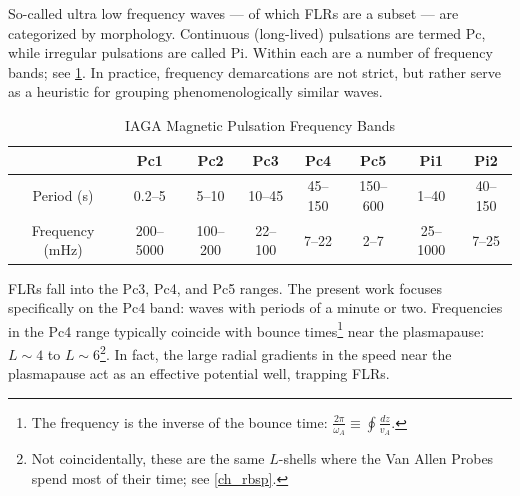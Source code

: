 
So-called ultra low frequency waves  --- of which FLRs are a subset --- are
categorized by morphology. Continuous (long-lived) pulsations are termed Pc,
while irregular pulsations are called Pi. Within each are a number of
frequency bands; see \cref{tab_iaga}\cite{jacobs_1964}. In practice, frequency
demarcations are not strict, but rather serve as a heuristic for grouping
phenomenologically similar waves\cite{hughes_1994}. 

\begin{longtable}{ @{\extracolsep{\fill}} cccccccc @{\extracolsep{\fill}} }
  \caption[IAGA Magnetic Pulsation Frequency Bands]
    {IAGA Magnetic Pulsation Frequency Bands}
  \label{tab_iaga} \\
  \toprule
  & Pc1 & Pc2 & Pc3 & Pc4 & Pc5 & Pi1 & Pi2 \\
  \midrule
  \endfirsthead
  \bottomrule
  \endlastfoot
  Period (\si{\second}) & 0.2--5    & 5--10    & 10--45  & 45--150 & 150--600 &
    1--40    & 40--150 \\
  Frequency (\si{\mHz}) & 200--5000 & 100--200 & 22--100 & 7--22   & 2--7     &
    25--1000 & 7--25 \\
\end{longtable}


FLRs fall into the Pc3, Pc4, and Pc5 ranges. The present work focuses
specifically on the Pc4 band: waves with periods of a minute or two.
Frequencies in the Pc4 range typically coincide with \Alfven bounce
times\footnote{The \Alfven frequency is the inverse of the \Alfven bounce time:
$\frac{2 \pi}{\omega_A} \equiv \oint \frac{dz}{v_A}$. } near the plasmapause:
$L\sim4$ to
$L\sim6$\cite{anderson_1990,dai_2015,engebretson_1992,liu_2009}\footnote{Not
coincidentally, these are the same $L$-shells where the Van Allen Probes
spend most of their time; see \cref{ch_rbsp}. }. In fact, the large radial
gradients in the \Alfven speed near the plasmapause act as an effective
potential well, trapping FLRs\cite{dai_2009,klimushkin_2004,lee_1999,
leonovich_2000,mager_2013,takahashi_2010}. 

